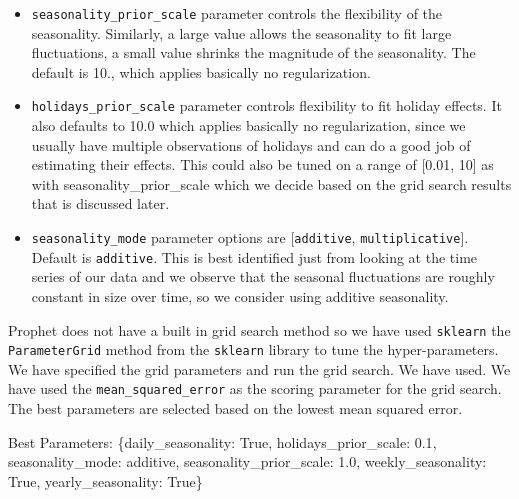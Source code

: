 \documentclass[mstat,12pt]{unswthesis}
\newenvironment{Shaded}{\begin{snugshade}}{\end{snugshade}}
\newcommand{\FloatTok}[1]{\textcolor[rgb]{0.00,0.00,0.81}{#1}}
\newcommand{\NormalTok}[1]{#1}
\newcommand{\StringTok}[1]{\textcolor[rgb]{0.31,0.60,0.02}{#1}}
\newcommand{\VariableTok}[1]{\textcolor[rgb]{0.00,0.00,0.00}{#1}}
\begin{document}
\begin{itemize}
\item
  \texttt{seasonality\_prior\_scale} parameter controls the flexibility
  of the seasonality. Similarly, a large value allows the seasonality to
  fit large fluctuations, a small value shrinks the magnitude of the
  seasonality. The default is 10., which applies basically no
  regularization.
\item
  \texttt{holidays\_prior\_scale} parameter controls flexibility to fit
  holiday effects. It also defaults to 10.0 which applies basically no
  regularization, since we usually have multiple observations of
  holidays and can do a good job of estimating their effects. This could
  also be tuned on a range of {[}0.01, 10{]} as with
  seasonality\_prior\_scale which we decide based on the grid search
  results that is discussed later.
\item
  \texttt{seasonality\_mode} parameter options are
  {[}\texttt{\textquotesingle{}additive\textquotesingle{}},
  \texttt{\textquotesingle{}multiplicative\textquotesingle{}}{]}.
  Default is \texttt{\textquotesingle{}additive\textquotesingle{}}. This
  is best identified just from looking at the time series of our data
  and we observe that the seasonal fluctuations are roughly constant in
  size over time, so we consider using additive seasonality.
\end{itemize}

Prophet does not have a built in grid search method so we have used
\texttt{sklearn} the \texttt{ParameterGrid} method from the
\texttt{sklearn} library to tune the hyper-parameters. We have specified
the grid parameters and run the grid search. We have used. We have used
the \texttt{mean\_squared\_error} as the scoring parameter for the grid
search. The best parameters are selected based on the lowest mean
squared error.

\begin{Shaded}
\begin{Highlighting}[]
\NormalTok{Best Parameters: \{}\StringTok{\textquotesingle{}daily\_seasonality\textquotesingle{}}\NormalTok{: }\VariableTok{True}\NormalTok{, }
                  \StringTok{\textquotesingle{}holidays\_prior\_scale\textquotesingle{}}\NormalTok{: }\FloatTok{0.1}\NormalTok{, }
                  \StringTok{\textquotesingle{}seasonality\_mode\textquotesingle{}}\NormalTok{: }\StringTok{\textquotesingle{}additive\textquotesingle{}}\NormalTok{, }
                  \StringTok{\textquotesingle{}seasonality\_prior\_scale\textquotesingle{}}\NormalTok{: }\FloatTok{1.0}\NormalTok{, }
                  \StringTok{\textquotesingle{}weekly\_seasonality\textquotesingle{}}\NormalTok{: }\VariableTok{True}\NormalTok{, }
                  \StringTok{\textquotesingle{}yearly\_seasonality\textquotesingle{}}\NormalTok{: }\VariableTok{True}\NormalTok{\}}
\end{Highlighting}
\end{Shaded}
\end{document}
